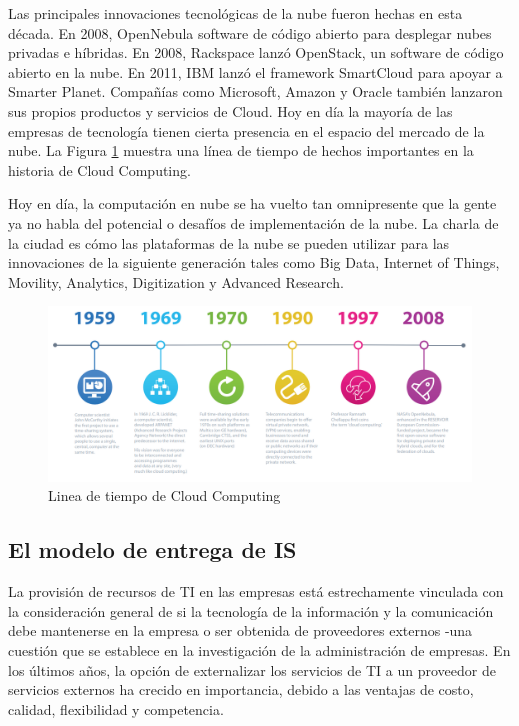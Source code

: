 \documentclass[a4paper, 12pt]{report}
\begin{document}
\begin{justify}
Las principales innovaciones tecnológicas de la nube fueron hechas en esta década. En 2008, OpenNebula software de código abierto para desplegar nubes privadas e híbridas. En 2008, Rackspace lanzó OpenStack, un software de código abierto en la nube. En 2011, IBM lanzó el framework SmartCloud para apoyar a Smarter Planet. Compañías como Microsoft, Amazon y Oracle también lanzaron sus propios productos y servicios de Cloud. Hoy en día la mayoría de las empresas de tecnología tienen cierta presencia en el espacio del mercado de la nube. La Figura \ref{fig:lineacloud} muestra una línea de tiempo de hechos importantes en la historia de Cloud Computing.

Hoy en día, la computación en nube se ha vuelto tan omnipresente que la gente ya no habla del potencial o desafíos de implementación de la nube. La charla de la ciudad es cómo las plataformas de la nube se pueden utilizar para las innovaciones de la siguiente generación tales como Big Data, Internet of Things, Movility, Analytics, Digitization y Advanced Research.
\end{justify}
\begin{figure}[ht]
	\begin{center}
		\includegraphics[width=1\textwidth]{lineacloud}
		\caption{Linea de tiempo de Cloud Computing}
		\label{fig:lineacloud}
	\end{center}
\end{figure}
\subsection{El modelo de entrega de IS}
\begin{justify}
La provisión de recursos de TI en las empresas está estrechamente vinculada con la consideración general de si la tecnología de la información y la comunicación debe mantenerse en la empresa o ser obtenida de proveedores externos -una cuestión que se establece en la investigación de la administración de empresas. En los últimos años, la opción de externalizar los servicios de TI a un proveedor de servicios externos ha crecido en importancia, debido a las ventajas de costo, calidad, flexibilidad y competencia. \cite{Markus}
\end{justify}
\end{document}
